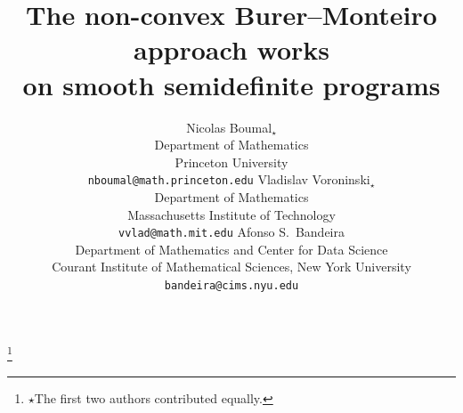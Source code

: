 \documentclass{article}
\title{The non-convex Burer--Monteiro approach works\\on smooth semidefinite programs}
\author{Nicolas Boumal$_\star$ \\ Department of Mathematics \\ Princeton University \\ \texttt{nboumal@math.princeton.edu} \And Vladislav Voroninski$_\star$ \\ Department of Mathematics \\ Massachusetts Institute of Technology \\ \texttt{vvlad@math.mit.edu} \And Afonso S.\ Bandeira \\ Department of Mathematics and Center for Data Science \\ Courant Institute of Mathematical Sciences, New York University \\ \texttt{bandeira@cims.nyu.edu}}
\newcommand{\1}{\mathbf{1}}
\begin{document}
\maketitle

{\let\thefootnote\relax\footnote{$\star$The first two authors contributed equally.}}
\setcounter{footnote}{0}

\begin{abstract}
	

\end{abstract}
\end{document}

